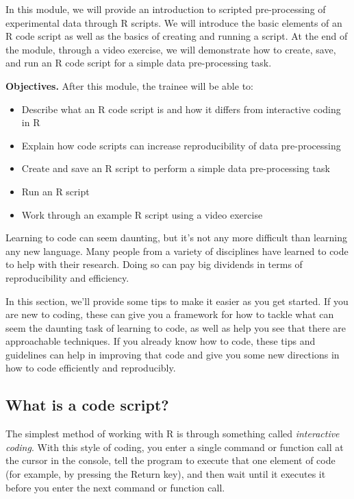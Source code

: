 \documentclass[]{tufte-book}
\providecommand{\tightlist}{%
  \setlength{\itemsep}{0pt}\setlength{\parskip}{0pt}}
\begin{document}
In this module, we will provide an introduction to scripted pre-processing of
experimental data through R scripts. We will introduce the basic elements of an
R code script as well as the basics of creating and running a script. At the end
of the module, through a video exercise, we will demonstrate how to create,
save, and run an R code script for a simple data pre-processing task.

\textbf{Objectives.} After this module, the trainee will be able to:

\begin{itemize}
\tightlist
\item
  Describe what an R code script is and how it differs from interactive
  coding in R
\item
  Explain how code scripts can increase reproducibility of data pre-processing
\item
  Create and save an R script to perform a simple data pre-processing task
\item
  Run an R script
\item
  Work through an example R script using a video exercise
\end{itemize}

Learning to code can seem daunting, but it's not any more difficult than
learning any new language. Many people from a variety of disciplines have
learned to code to help with their research. Doing so can pay big dividends in
terms of reproducibility and efficiency.

In this section, we'll provide some tips to make it easier as you get started.
If you are new to coding, these can give you a framework for how to tackle what
can seem the daunting task of learning to code, as well as help you see that
there are approachable techniques. If you already know how to code, these tips
and guidelines can help in improving that code and give you some new directions
in how to code efficiently and reproducibly.

\subsection{What is a code script?}\label{what-is-a-code-script}

The simplest method of working with R is through something called \emph{interactive
coding}. With this style of coding, you enter a single command or function call
at the cursor in the console, tell the program to execute that one element of
code (for example, by pressing the Return key), and then wait until it executes
it before you enter the next command or function call.
\end{document}
